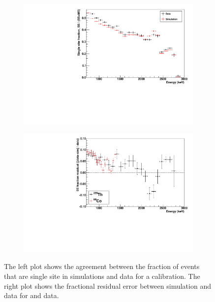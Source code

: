 \documentclass[herrin-thesis.tex]{subfiles}
\begin{document}
\begin{figure}[htbp]
\centering
	\begin{subfigure}[b]{0.48\textwidth}
	\centering
	\includegraphics[width=\textwidth]{./plots/analysis_ssfrac_agreement.pdf}
	\end{subfigure}\hfill%
	\begin{subfigure}[b]{0.48\textwidth}
	\centering
	\includegraphics[width=\textwidth]{./plots/analysis_ssfrac_residuals.pdf}
	\end{subfigure}
\caption[Single site fraction agreement between simulation and data]{The left plot shows the agreement between the fraction of events that are single site in simulations and data for a  calibration. The right plot shows the fractional residual error between simulation and data for  and  data.}
\label{fig:analysis_ssfrac_agreement}
\end{figure}
\end{document}
